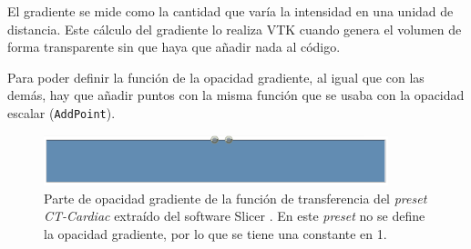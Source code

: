 El gradiente se mide como la cantidad que varía la intensidad en una unidad de distancia. Este cálculo del gradiente lo realiza VTK cuando genera el volumen de forma transparente sin que haya que añadir nada al código.

Para poder definir la función de la opacidad gradiente, al igual que con las demás, hay que añadir puntos con la misma función que se usaba con la opacidad escalar (\texttt{AddPoint}). 

\begin{figure}[H]
	\centering
	\includegraphics[width=10cm]{imagenes/gradient_tf}
	\caption{Parte de opacidad gradiente de la función de transferencia del \textit{preset} \textit{CT-Cardiac} extraído del software Slicer \cite{slicer}. En este \textit{preset} no se define la opacidad gradiente, por lo que se tiene una constante en 1.}
	\label{fig:gradient_tf}
\end{figure}
